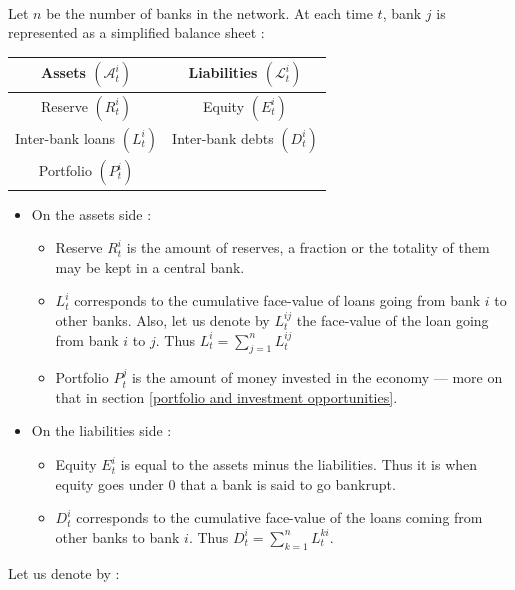 \documentclass{article}
\begin{document}
\paragraph{}
Let $n$ be the number of banks in the network. At each time $t$, bank $j$ is represented as a simplified balance sheet : 


\begin{center}
\begin{tabular}{|c|c|}
    \hline
    Assets $(\mathcal{A}_t^i)$ & Liabilities $(\mathcal{L}_t^i)$ \\
    \hline
    Reserve $(R_t^i)$ & Equity $(E_t^i)$\\
    Inter-bank loans $(L_t^i)$ & Inter-bank debts $(D_t^i)$\\
    Portfolio $(P_t^i)$ & \\
\hline
\end{tabular}
\end{center}


\begin{itemize}
    \item On the assets side : 
    \begin{itemize}
        \item Reserve $R_t^i$ is the amount of reserves, a fraction or the totality of them may be kept in a central bank.
        \item $L_t^i$ corresponds to the cumulative face-value of loans going from bank $i$ to other banks. Also, let us denote by $L_t^{ij}$ the face-value of the loan going from bank $i$ to $j$. Thus $L_t^i = \sum_{j=1}^nL_t^{ij} $
        \item Portfolio $P_t^j$ is the amount of money invested in the economy --- more on that in section \ref{portfolio and investment opportunities}.
    \end{itemize}
    \item On the liabilities side : 
        \begin{itemize}
        \item Equity $E_t^i$ is equal to the assets minus the liabilities. Thus it is when equity goes under 0 that a bank is said to go bankrupt.
        \item $D_t^i$ corresponds to the cumulative face-value of the loans coming from other banks to bank $i$. Thus $D_t^i = \sum_{k=1}^{n} L^{ki}_t$.
    \end{itemize}
\end{itemize}


Let us denote by : 
\end{document}
